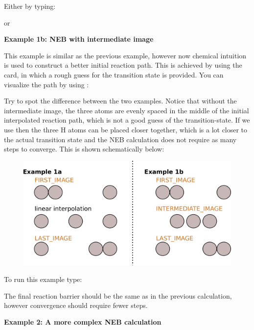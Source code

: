 \documentclass[landscape]{foils}
\begin{document}
Either by typing:


or


{\bf Example 1b: NEB with intermediate image}

This example is similar as the previous example, however now chemical
intuition is used to construct a better initial reaction path. This is
achieved by using the  card, in which a
rough guess for the transition state is provided. You can visualize
the path by using :


Try to spot the difference between the two examples. Notice that
without the intermediate image, the three atoms are evenly spaced in
the middle of the initial interpolated reaction path, which is not a
good guess of the transition-state. If we use
 then the three H atoms can be placed closer
together, which is a lot closer to the actual transition state and the
NEB calculation does not require as many steps to converge. This is
shown schematically below:

\begin{figure}
  \centering
    \includegraphics[width=22cm]{figs/neb-w-intermimage.pdf}
\end{figure}

To run this example type:

{\small {}}

The final reaction barrier should be the same as in the previous
calculation, however convergence should require fewer steps.

{\bf Example 2: A more complex NEB calculation}
\end{document}
